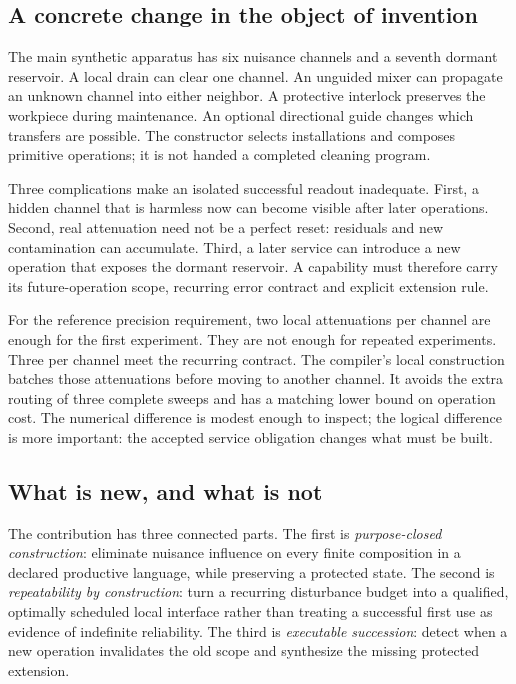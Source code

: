 \documentclass[11pt,letterpaper]{article}
\theoremstyle{definition}\newtheorem{definition}[theorem]{Definition}
\theoremstyle{remark}\newtheorem{remark}[theorem]{Remark}
\begin{document}
\subsection{A concrete change in the object of invention}
The main synthetic apparatus has six nuisance channels and a seventh dormant reservoir. A local drain can clear one channel. An unguided mixer can propagate an unknown channel into either neighbor. A protective interlock preserves the workpiece during maintenance. An optional directional guide changes which transfers are possible. The constructor selects installations and composes primitive operations; it is not handed a completed cleaning program.

Three complications make an isolated successful readout inadequate. First, a hidden channel that is harmless now can become visible after later operations. Second, real attenuation need not be a perfect reset: residuals and new contamination can accumulate. Third, a later service can introduce a new operation that exposes the dormant reservoir. A capability must therefore carry its future-operation scope, recurring error contract and explicit extension rule.

For the reference precision requirement, two local attenuations per channel are enough for the first experiment. They are not enough for repeated experiments. Three per channel meet the recurring contract. The compiler's local construction batches those attenuations before moving to another channel. It avoids the extra routing of three complete sweeps and has a matching lower bound on operation cost. The numerical difference is modest enough to inspect; the logical difference is more important: the accepted service obligation changes what must be built.

\subsection{What is new, and what is not}
The contribution has three connected parts. The first is \emph{purpose-closed construction}: eliminate nuisance influence on every finite composition in a declared productive language, while preserving a protected state. The second is \emph{repeatability by construction}: turn a recurring disturbance budget into a qualified, optimally scheduled local interface rather than treating a successful first use as evidence of indefinite reliability. The third is \emph{executable succession}: detect when a new operation invalidates the old scope and synthesize the missing protected extension.
\end{document}
